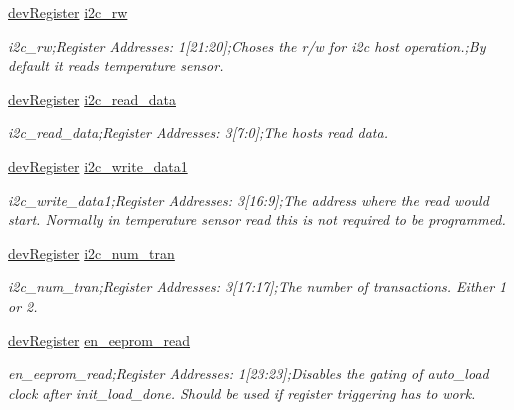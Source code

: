\begin{DoxyCompactItemize}
\mbox{\hyperlink{classdev_register}{dev\+Register}} \mbox{\hyperlink{class_o_p_t3101_registers_a21638bd4e30c109088a1ac38fb23ef23}{i2c\+\_\+rw}}
\begin{DoxyCompactList}\small\item\em i2c\+\_\+rw;Register Addresses\+: 1\mbox{[}21\+:20\mbox{]};Choses the r/w for i2c host operation.;By default it reads temperature sensor. \end{DoxyCompactList}\item 
\mbox{\hyperlink{classdev_register}{dev\+Register}} \mbox{\hyperlink{class_o_p_t3101_registers_a5ea093c7c669af60ee3528d4e47751ec}{i2c\+\_\+read\+\_\+data}}
\begin{DoxyCompactList}\small\item\em i2c\+\_\+read\+\_\+data;Register Addresses\+: 3\mbox{[}7\+:0\mbox{]};The hosts read data. \end{DoxyCompactList}\item 
\mbox{\hyperlink{classdev_register}{dev\+Register}} \mbox{\hyperlink{class_o_p_t3101_registers_aa1d6fab1063e7f0b1d5a245b1437e35a}{i2c\+\_\+write\+\_\+data1}}
\begin{DoxyCompactList}\small\item\em i2c\+\_\+write\+\_\+data1;Register Addresses\+: 3\mbox{[}16\+:9\mbox{]};The address where the read would start. Normally in temperature sensor read this is not required to be programmed. \end{DoxyCompactList}\item 
\mbox{\hyperlink{classdev_register}{dev\+Register}} \mbox{\hyperlink{class_o_p_t3101_registers_a0a161f183b2a43ba1fb8bc1fa7e7d764}{i2c\+\_\+num\+\_\+tran}}
\begin{DoxyCompactList}\small\item\em i2c\+\_\+num\+\_\+tran;Register Addresses\+: 3\mbox{[}17\+:17\mbox{]};The number of transactions. Either 1 or 2. \end{DoxyCompactList}\item 
\mbox{\hyperlink{classdev_register}{dev\+Register}} \mbox{\hyperlink{class_o_p_t3101_registers_a4961f0f3fa6789d072d688591190cd5d}{en\+\_\+eeprom\+\_\+read}}
\begin{DoxyCompactList}\small\item\em en\+\_\+eeprom\+\_\+read;Register Addresses\+: 1\mbox{[}23\+:23\mbox{]};Disables the gating of auto\+\_\+load clock after init\+\_\+load\+\_\+done. Should be used if register triggering has to work. \end{DoxyCompactList}\item 

\end{DoxyCompactItemize}
